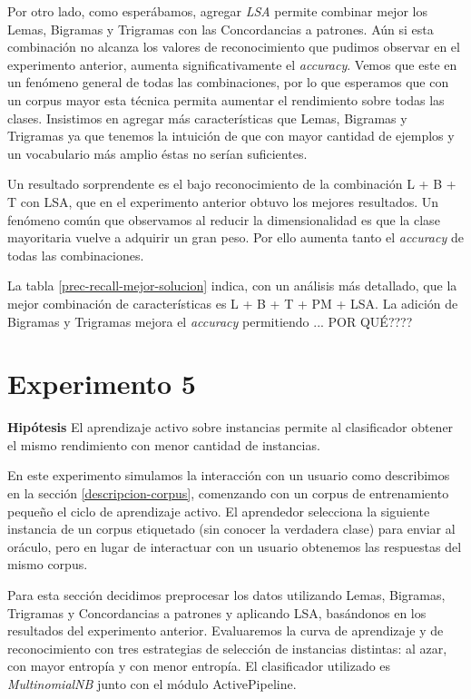 Por otro lado, como esperábamos, agregar \textit{LSA} permite combinar mejor los Lemas, Bigramas y Trigramas con las Concordancias a patrones. Aún si esta combinación no alcanza los valores de reconocimiento que pudimos observar en el experimento anterior, aumenta significativamente el \textit{accuracy}. Vemos que este en un fenómeno general de todas las combinaciones, por lo que esperamos que con un corpus mayor esta técnica permita aumentar el rendimiento sobre todas las clases. Insistimos en agregar más características que Lemas, Bigramas y Trigramas ya que tenemos la intuición de que con mayor cantidad de ejemplos y un vocabulario más amplio éstas no serían suficientes.

Un resultado sorprendente es el bajo reconocimiento de la combinación L + B + T con LSA, que en el experimento anterior obtuvo los mejores resultados. Un fenómeno común que observamos al reducir la dimensionalidad es que la clase mayoritaria vuelve a adquirir un gran peso. Por ello aumenta tanto el \textit{accuracy} de todas las combinaciones.

La tabla \ref{prec-recall-mejor-solucion} indica, con un análisis más detallado, que la mejor combinación de características es L + B + T + PM + LSA. La adición de Bigramas y Trigramas mejora el \textit{accuracy} permitiendo ... POR QUÉ????

\section{Experimento 5}\label{experimento-aa-instancias}
\vspace{3 mm}
\textbf{Hipótesis} El aprendizaje activo sobre instancias permite al clasificador obtener el mismo rendimiento con menor cantidad de instancias.
\vspace{3 mm}

En este experimento simulamos la interacción con un usuario como describimos en la sección \ref{descripcion-corpus}, comenzando con un corpus de entrenamiento pequeño el ciclo de aprendizaje activo. El aprendedor selecciona la siguiente instancia de un corpus etiquetado (sin conocer la verdadera clase) para enviar al oráculo, pero en lugar de interactuar con un usuario obtenemos las respuestas del mismo corpus.

Para esta sección decidimos preprocesar los datos utilizando Lemas, Bigramas, Trigramas y Concordancias a patrones y aplicando LSA, basándonos en los resultados del experimento anterior. Evaluaremos la curva de aprendizaje y de reconocimiento con tres estrategias de selección de instancias distintas: al azar, con mayor entropía y con menor entropía. El clasificador utilizado es \textit{MultinomialNB} junto con el módulo ActivePipeline.

